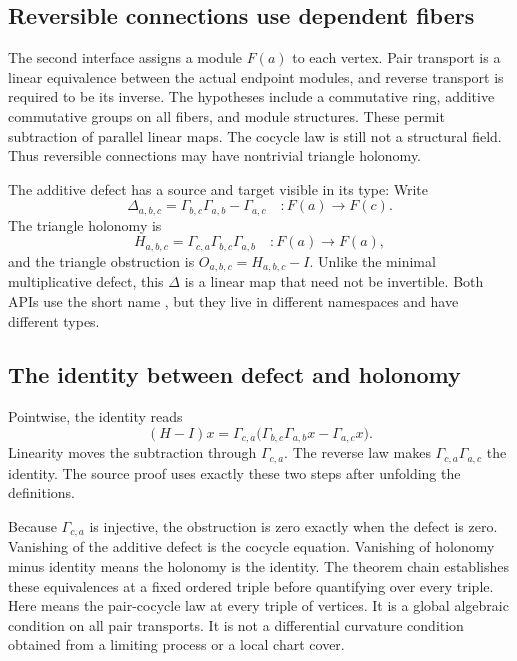 \subsection{Reversible connections use dependent fibers}
The second interface assigns a module $F(a)$ to each vertex. Pair transport is a linear equivalence between the actual endpoint modules, and reverse transport is required to be its inverse.
The hypotheses include a commutative ring, additive commutative groups on all fibers, and module structures. These permit subtraction of parallel linear maps. The cocycle law is still not a structural field. Thus reversible connections may have nontrivial triangle holonomy.

The additive defect has a source and target visible in its type:
Write
\[
 \Delta_{a,b,c}=\Gamma_{b,c}\Gamma_{a,b}-\Gamma_{a,c}
 \quad:F(a)\longrightarrow F(c).
\]
The triangle holonomy is
\[
 H_{a,b,c}=\Gamma_{c,a}\Gamma_{b,c}\Gamma_{a,b}
 \quad:F(a)\longrightarrow F(a),
\]
and the triangle obstruction is $O_{a,b,c}=H_{a,b,c}-I$. Unlike the minimal multiplicative defect, this $\Delta$ is a linear map that need not be invertible. Both APIs use the short name , but they live in different namespaces and have different types.

\subsection{The identity between defect and holonomy}
Pointwise, the identity reads
\[
 (H-I)x=\Gamma_{c,a}\bigl(\Gamma_{b,c}\Gamma_{a,b}x
                    -\Gamma_{a,c}x\bigr).
\]
Linearity moves the subtraction through $\Gamma_{c,a}$. The reverse law makes $\Gamma_{c,a}\Gamma_{a,c}$ the identity. The source proof uses exactly these two steps after unfolding the definitions.

Because $\Gamma_{c,a}$ is injective, the obstruction is zero exactly when the defect is zero. Vanishing of the additive defect is the cocycle equation. Vanishing of holonomy minus identity means the holonomy is the identity. The theorem chain establishes these equivalences at a fixed ordered triple before quantifying over every triple.
Here  means the pair-cocycle law at every triple of vertices. It is a global algebraic condition on all pair transports. It is not a differential curvature condition obtained from a limiting process or a local chart cover.

